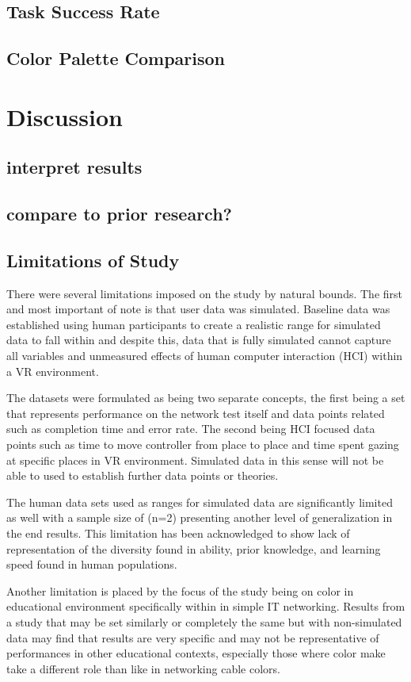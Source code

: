 \documentclass[acmlarge]{acmart}
\begin{document}
\subsection{Task Success Rate}

\subsection{Color Palette Comparison}

\section{Discussion}
\subsection{interpret results}
\subsection{compare to prior research?}
\subsection{Limitations of Study}
There were several limitations imposed on the study by natural bounds. The first and most important of note is that user data was simulated. Baseline data was established using human participants to create a realistic range for simulated data to fall within and despite this, data that is fully simulated cannot capture all variables and unmeasured effects of human computer interaction (HCI) within a VR environment.

The datasets were formulated as being two separate concepts, the first being a set that represents performance on the network test itself and data points related such as completion time and error rate. The second being HCI focused data points such as time to move controller from place to place and time spent gazing at specific places in VR environment. Simulated data in this sense will not be able to used to establish further data points or theories.

The human data sets used as ranges for simulated data are significantly limited as well with a sample size of  (n=2) presenting another level of generalization in the end results. This limitation has been acknowledged to show lack of representation of the diversity found in ability, prior knowledge, and learning speed found in human populations.

Another limitation is placed by the focus of the study being on color in educational environment specifically within in simple IT networking. Results from a study that may be set similarly or completely the same but with non-simulated data may find that results are very specific and may not be representative of performances in other educational contexts, especially those where color make take a different role than like in networking cable colors.
\end{document}
